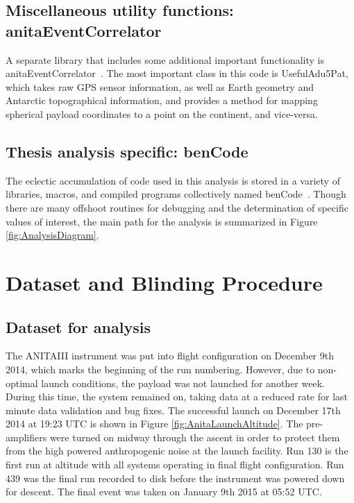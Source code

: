 	\subsection{Miscellaneous utility functions: anitaEventCorrelator}
		A separate library that includes some additional important functionality is anitaEventCorrelator~\cite{anitaEventCorrelator}.  The most important class in this code is UsefulAdu5Pat, which takes raw GPS sensor information, as well as Earth geometry and Antarctic topographical information, and provides a method for mapping spherical payload coordinates to a point on the continent, and vice-versa.
		
		
	\subsection{Thesis analysis specific: benCode}
		The eclectic accumulation of code used in this analysis is stored in a variety of libraries, macros, and compiled programs collectively named benCode~\cite{benCode}.  Though there are many offshoot routines for debugging and the determination of specific values of interest, the main path for the analysis is summarized in Figure \ref{fig:AnalysisDiagram}.

	
	
	
\section{Dataset and Blinding Procedure}%
	
	\subsection{Dataset for analysis}
		The ANITAIII instrument was put into flight configuration on December 9th 2014, which marks the beginning of the run numbering.  However, due to non-optimal launch conditions, the payload was not launched for another week.  During this time, the system remained on, taking data at a reduced rate for last minute data validation and bug fixes.  The successful launch on December 17th 2014 at 19:23 UTC is shown in Figure \ref{fig:AnitaLaunchAltitude}.  The pre-amplifiers were turned on midway through the ascent in order to protect them from the high powered anthropogenic noise at the launch facility. Run 130 is the first run at altitude with all systems operating in final flight configuration.  Run 439 was the final run recorded to disk before the instrument was powered down for descent.  The final event was taken on January 9th 2015 at 05:52 UTC.
			
